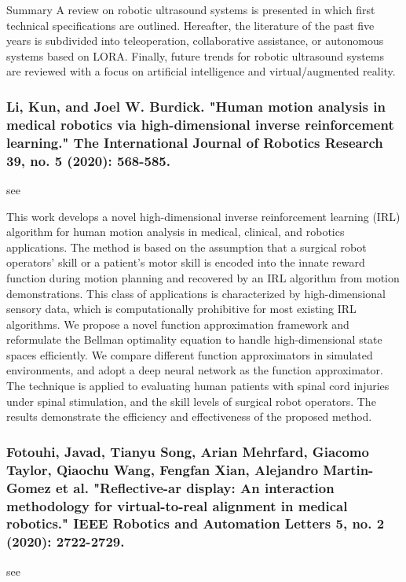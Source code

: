 \documentclass[conference]{IEEEtran}
\begin{document}
Summary
A review on robotic ultrasound systems is presented in which first technical specifications are outlined. Hereafter, the literature of the past five years is subdivided into teleoperation, collaborative assistance, or autonomous systems based on LORA. Finally, future trends for robotic ultrasound systems are reviewed with a focus on artificial intelligence and virtual/augmented reality.

\medskip
\subsubsection{Li, Kun, and Joel W. Burdick. "Human motion analysis in medical robotics via high-dimensional inverse reinforcement learning." The International Journal of Robotics Research 39, no. 5 (2020): 568-585.}
see \cite{li2020human}

This work develops a novel high-dimensional inverse reinforcement learning (IRL) algorithm for human motion analysis in medical, clinical, and robotics applications. The method is based on the assumption that a surgical robot operators’ skill or a patient’s motor skill is encoded into the innate reward function during motion planning and recovered by an IRL algorithm from motion demonstrations. This class of applications is characterized by high-dimensional sensory data, which is computationally prohibitive for most existing IRL algorithms. We propose a novel function approximation framework and reformulate the Bellman optimality equation to handle high-dimensional state spaces efficiently. We compare different function approximators in simulated environments, and adopt a deep neural network as the function approximator. The technique is applied to evaluating human patients with spinal cord injuries under spinal stimulation, and the skill levels of surgical robot operators. The results demonstrate the efficiency and effectiveness of the proposed method.

\medskip
\subsubsection{Fotouhi, Javad, Tianyu Song, Arian Mehrfard, Giacomo Taylor, Qiaochu Wang, Fengfan Xian, Alejandro Martin-Gomez et al. "Reflective-ar display: An interaction methodology for virtual-to-real alignment in medical robotics." IEEE Robotics and Automation Letters 5, no. 2 (2020): 2722-2729.}
see \cite{fotouhi2020reflective}
\end{document}
